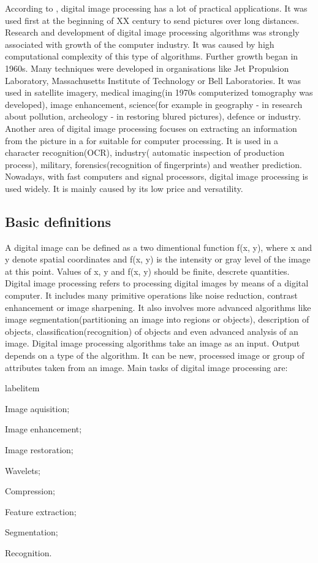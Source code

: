 \documentclass[a4paper,onecolumn,oneside,12pt]{memoir}
\makeatletter
\renewenvironment{itemize}{
  \begin{list}{  
  \csname labelitem\romannumeral\the\@listdepth\endcsname}{
  \setlength{\leftmargin}{1em}
	\setlength{\topsep}{6pt}%
	\setlength{\partopsep}{0pt}%
	\setlength{\parskip}{0pt}%
	\setlength{\parsep}{0pt}%
	\setlength{\itemsep}{0pt}}
}{
  \end{list}
}
\makeatother
\begin{document}
According to \cite{digitalImageProcessing},
digital image processing has a lot of practical applications. It was used first at the beginning of
XX century to send pictures over long distances. Research and development of digital image
processing algorithms  was strongly associated with growth of the computer industry. It was caused
by high computational complexity of this type of algorithms. Further growth began in 1960s. Many 
techniques were developed in organisations like Jet Propulsion Laboratory, Massachusetts Institute
of Technology or Bell Laboratories. It was used in satellite imagery, medical imaging(in 1970s 
computerized tomography was developed), image enhancement, science(for example in geography - 
in research about pollution, archeology - in restoring blured pictures), defence or industry.
Another area of digital image processing focuses on extracting an information from the picture in
a for suitable for computer processing. It is used in a character recognition(OCR), industry(
automatic inspection of production process), military, forensics(recognition of fingerprints) and
weather prediction. \\

Nowadays, with fast computers and signal processors, digital image processing is used widely.
It is mainly caused by its low price and versatility.

\subsection{Basic definitions}

A digital image can be defined as a two dimentional function f(x, y), where x and y denote spatial 
coordinates and f(x, y) is the intensity or gray level of the image at this point. Values of x, y
and f(x, y) should be finite, descrete quantities. Digital image processing refers to processing 
digital images by means of a digital computer. It includes many primitive operations like noise
reduction, contrast enhancement or image sharpening. It also involves more advanced algorithms like
image segmentation(partitioning an image into regions or objects), description of objects,
classification(recognition) of objects and even advanced analysis of an image. Digital image 
processing algorithms take an image as an input. Output depends on a type of the algorithm.
It can be new, processed image or group of attributes taken from an image. Main tasks of digital
image processing are:

\begin{itemize}
  \item Image aquisition;
  \item Image enhancement;
  \item Image restoration;
  \item Wavelets;
  \item Compression;
  \item Feature extraction;
  \item Segmentation;
  \item Recognition.
\end{itemize}
\end{document}
